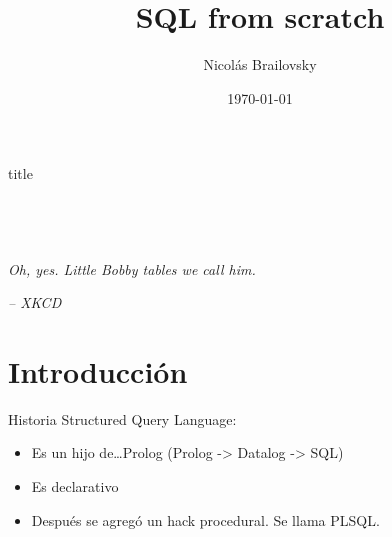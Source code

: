 \documentclass{beamer}
\institute[BoC Tech Talks]{BoC Tech Talks}
\date[] {\today}
\title[SQL from scratch]{SQL from scratch}
\subtitle{}
\author[]{Nicol\'as Brailovsky}
\begin{document}
\begin{frame}[plain]
	\begin{center}  \end{center}
	\rule{0em}{5pt}

	\begin{beamercolorbox}[sep=.1cm,shadow=true,rounded=true,center]{title}
		\inserttitle
	\end{beamercolorbox}

	\begin{columns}[onlytextwidth]
		\begin{center}
		\end{center}
		\begin{center} {\color{orange} \insertinstitute }  \end{center}
	\end{columns}

	\begin{center}
		{\color{orange} 
			\insertauthor \\
			\rule{0em}{8pt}
			\insertdate
		}
	\end{center}
\end{frame}

\begin{frame}
  \tableofcontents
\textit{Oh, yes. Little Bobby tables we call him.} \bigskip
\begin{center}\textit{ -- XKCD} \end{center}
\end{frame}

\section{Introducci\'on}

\begin{frame}{Historia}
	Structured Query Language:
	\begin{itemize}
		\item Es un hijo de\ldots Prolog (Prolog -> Datalog -> SQL)
		\item Es declarativo
		\item Despu\'es se agreg\'o un hack procedural. Se llama PLSQL.
	\end{itemize}
\end{frame}
\end{document}
